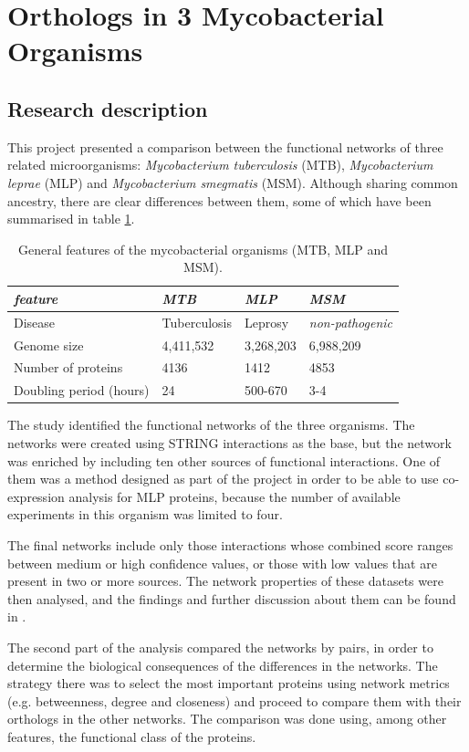 \section{Orthologs in 3 Mycobacterial Organisms}\label{sec:orthologs}
\subsection{Research description}
This project presented a comparison between the functional networks of three related microorganisms: \emph{Mycobacterium tuberculosis} (MTB), \emph{Mycobacterium leprae} (MLP) and \emph{Mycobacterium smegmatis} (MSM). Although sharing common ancestry, there are clear differences between them, some of which have been summarised in table \ref{tab:orthologs}.


\begin{table}[!ht]
        \begin{tabular}{|p{6cm}|p{3cm}|p{3cm}|p{3cm}|}
\hline 
\emph{feature} & \emph{MTB} & \emph{MLP} & \emph{MSM}\\
\hline 
Disease & Tuberculosis & Leprosy & \emph{non-pathogenic}\\
\hline 
Genome size & 4,411,532 & 3,268,203 & 6,988,209\\
\hline 
Number of proteins & 4136 & 1412 & 4853\\
\hline 
Doubling period (hours) & 24  & 500-670 & 3-4 \\
\hline 
        \end{tabular}
        \caption{General features of the mycobacterial organisms (MTB, MLP and MSM).}
        \label{tab:orthologs}
\end{table}

The study identified the functional networks of the three organisms. The networks were created using STRING interactions as the base, but the network was enriched by including ten other sources of functional interactions. One of them was a method designed as part of the project in order to be able to use co-expression analysis for MLP proteins, because the number of available experiments in this organism was limited to four.

The final networks include only those interactions whose combined score ranges between medium or high confidence values, or those with low values that are present in two or more sources.  The network properties of these datasets were then analysed, and the findings and further discussion about them can be found in \cite{AKI2013}.

The second part of the analysis compared the networks by pairs, in order to determine the biological consequences of the differences in the networks. The strategy there was to select the most important proteins using network metrics (e.g. betweenness, degree and closeness) and proceed to compare them with their orthologs in the other networks. The comparison was done using, among other features, the functional class of the proteins. 

